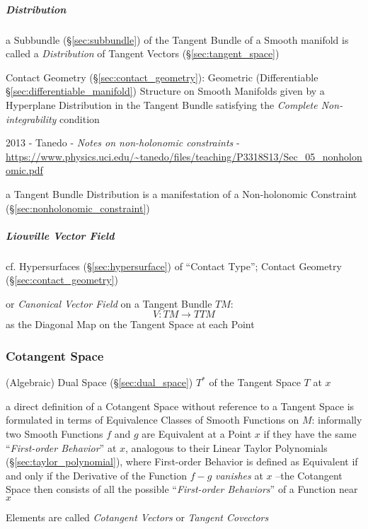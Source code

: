 \subparagraph{Distribution}\label{sec:tangent_bundle_distribution}\hfill

a Subbundle (\S\ref{sec:subbundle}) of the Tangent Bundle of a Smooth manifold
is called a \emph{Distribution} of Tangent Vectors (\S\ref{sec:tangent_space})

\fist Contact Geometry (\S\ref{sec:contact_geometry}): Geometric (Differentiable
\S\ref{sec:differentiable_manifold}) Structure on Smooth Manifolds given by a
Hyperplane Distribution in the Tangent Bundle satisfying the \emph{Complete
  Non-integrability} condition

2013 - Tanedo - \emph{Notes on non-holonomic constraints} -
\url{https://www.physics.uci.edu/~tanedo/files/teaching/P3318S13/Sec_05_nonholonomic.pdf}

a Tangent Bundle Distribution is a manifestation of a Non-holonomic Constraint
(\S\ref{sec:nonholonomic_constraint})



\subparagraph{Liouville Vector Field}\label{sec:liouville_vector_field}\hfill

cf. Hypersurfaces (\S\ref{sec:hypersurface}) of ``Contact Type''; \fist Contact
Geometry (\S\ref{sec:contact_geometry})

or \emph{Canonical Vector Field} on a Tangent Bundle $TM$:
\[
  V : TM \rightarrow TTM
\]
as the Diagonal Map on the Tangent Space at each Point



\subsubsection{Cotangent Space}\label{sec:cotangent_space}

(Algebraic) Dual Space (\S\ref{sec:dual_space}) $T^*$ of the Tangent Space $T$
at $x$

a direct definition of a Cotangent Space without reference to a Tangent Space
is formulated in terms of Equivalence Classes of Smooth Functions on $M$:
informally two Smooth Functions $f$ and $g$ are Equivalent at a Point $x$ if
they have the same ``\emph{First-order Behavior}'' at $x$, analogous to their
Linear Taylor Polynomials (\S\ref{sec:taylor_polynomial}), where First-order
Behavior is defined as Equivalent if and only if the Derivative of the Function
$f-g$ \emph{vanishes} at $x$ --the Cotangent Space then consists of all the
possible ``\emph{First-order Behaviors}'' of a Function near $x$

Elements are called \emph{Cotangent Vectors} or \emph{Tangent Covectors}

